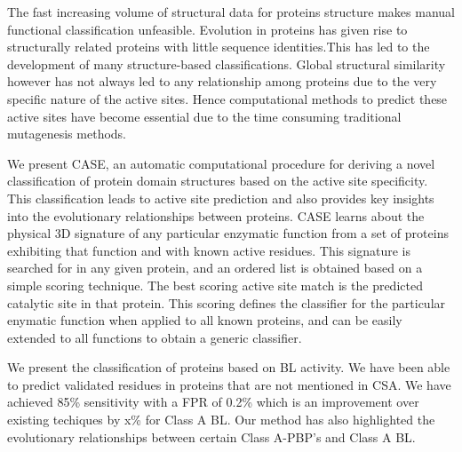 The fast increasing volume of structural data for proteins structure makes manual functional classification unfeasible. Evolution in proteins has given rise to 
structurally related proteins with little sequence identities.This has led to the development of many structure-based classifications. Global structural similarity however has not always led to any relationship among proteins due to the very specific nature of the active sites. 
Hence computational methods to predict these active sites have become essential due to the time consuming traditional mutagenesis methods. 

We present CASE, an automatic computational procedure for deriving a novel classification of protein domain structures based on the active site specificity.
This classification leads to active site prediction and also provides key insights into the evolutionary relationships between proteins.
CASE learns about the physical 3D signature of any particular enzymatic function from a set of proteins exhibiting that function and with known active residues. 
This signature is searched for in any given protein, and an ordered list is obtained based on a simple scoring technique. The best
scoring active site match is the predicted catalytic site in that protein. This scoring defines the classifier for the particular enymatic function when applied to all known proteins, and can be easily extended to all functions to obtain a generic classifier.

We present the classification of proteins based on BL activity.
We have been able to predict validated residues in proteins that are not mentioned in CSA.
We have achieved 85\% sensitivity with a FPR of 0.2\% which is an improvement over existing techiques by x\% for Class A BL. 
Our method has also highlighted the evolutionary relationships between certain Class A-PBP's and Class A BL.
